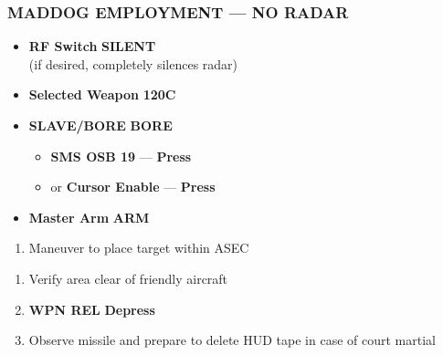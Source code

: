 \subsubsection{MADDOG EMPLOYMENT --- NO RADAR}
\label{subsec:aim120:maddog}
\begin{checklistenumerate}
    \blueitem[Prerequisites]
    \begin{itemize}
        \item \textbf{RF Switch} \dotfill \textbf{SILENT} \\
        \hfill (if desired, completely silences radar)
        \item \textbf{Selected Weapon} \dotfill \textbf{120C}
        \item \textbf{SLAVE/BORE} \dotfill \textbf{BORE}
        \begin{itemize}
            \item \textbf{SMS OSB 19} --- \textbf{Press}
            \item or \textbf{Cursor Enable} --- \textbf{Press}
        \end{itemize}
        \item \textbf{Master Arm} \dotfill \textbf{ARM}
    \end{itemize}
    \begin{enumerate}
        \item Maneuver to place target within ASEC
    \end{enumerate}
    \begin{enumerate}
        \item Verify area clear of friendly aircraft
        \item \textbf{WPN REL} \dotfill \textbf{Depress}
        \item Observe missile and prepare to delete HUD tape in case of court martial
    \end{enumerate}
\end{checklistenumerate}

\clearpage

